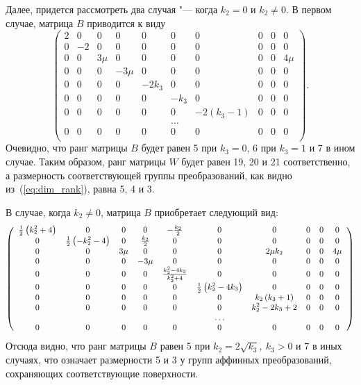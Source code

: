 \documentclass[../main.tex]{subfiles}
\begin{document}
Далее, придется рассмотреть два случая "--- когда $k_2 = 0$ и $k_2 \ne 0$. В первом случае, матрица $B$ приводится к виду
\begin{equation*} 
\left(
\begin{array}{cccccccccc}
 2 & 0 & 0 & 0 & 0 & 0 & 0 & 0 & 0 & 0 \\
 0 & -2 & 0 & 0 & 0 & 0 & 0 & 0 & 0 & 0 \\
 0 & 0 & 3 \mu  & 0 & 0 & 0 & 0 & 0 & 0 & 4 \mu  \\
 0 & 0 & 0 & -3 \mu  & 0 & 0 & 0 & 0 & 0 & 0 \\
 0 & 0 & 0 & 0 & -2 k_3 & 0 & 0 & 0 & 0 & 0 \\
 0 & 0 & 0 & 0 & 0 & -k_3 & 0 & 0 & 0 & 0 \\
 0 & 0 & 0 & 0 & 0 & 0 & -2 \left(k_3-1\right) & 0 & 0 & 0 \\
   &   &   &   &   & \hdots &   &   &   &   \\
 0 & 0 & 0 & 0 & 0 & 0 & 0 & 0 & 0 & 0 \\
\end{array}
\right).
\end{equation*} 
Очевидно, что ранг матрицы $B$ будет равен 5 при $k_3 = 0$, 6 при $k_3 = 1$ и 7 в ином случае. Таким образом, ранг матрицы $W$ будет равен 19, 20 и 21 соответственно, а размерность соответствующей группы преобразований, как видно из~(\ref{eq:dim_rank}), равна 5, 4 и 3.

В случае, когда $k_2 \ne 0$, матрица $B$ приобретает следующий вид:
\begin{equation*}
{\small\left(
\begin{array}{cccccccccc}
 \frac{1}{2} \left(k_2^2+4\right) & 0 & 0 & 0 & -\frac{k_2}{2} & 0 & 0 & 0 & 0 & 0 \\
 0 & \frac{1}{2} \left(-k_2^2-4\right) & 0 & \frac{k_2}{2} & 0 & 0 & 0 & 0 & 0 & 0 \\
 0 & 0 & 3 \mu  & 0 & 0 & 0 & 2 \mu  k_2 & 0 & 0 & 4 \mu  \\
 0 & 0 & 0 & -3 \mu  & 0 & 0 & 0 & 0 & 0 & 0 \\
 0 & 0 & 0 & 0 & \frac{k_2^2 - 4 k_3}{k_2^2+4} & 0 & 0 & 0 & 0 & 0 \\
 0 & 0 & 0 & 0 & 0 & \frac{1}{2} \left(k_2^2-4 k_3\right) & 0 & 0 & 0 & 0 \\
 0 & 0 & 0 & 0 & 0 & 0 & k_2 \left(k_3+1\right) & 0 & 0 & 0 \\
 0 & 0 & 0 & 0 & 0 & 0 & k_2^2-2 k_3+2 & 0 & 0 & 0 \\
   &   &   &   &   & \hdots &   &   &   &   \\
 0 & 0 & 0 & 0 & 0 & 0 & 0 & 0 & 0 & 0 \\
\end{array}
\right)}
\end{equation*}
Отсюда видно, что ранг матрицы $B$ равен 5 при $k_2 = 2\sqrt{k_3},~k_3 > 0$ и 7 в иных случаях, что означает размерности 5 и 3 у групп аффинных преобразований, сохраняющих соответствующие поверхности.
\end{document}
